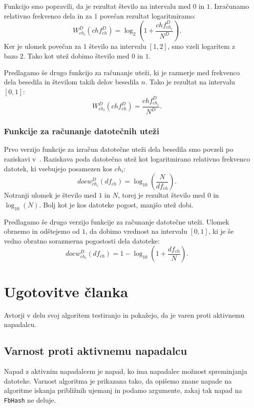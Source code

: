 \documentclass{acm_proc_article-sp}
\begin{document}
Funkcijo smo popravili, da je rezultat število na intervalu med $0$ in $1$. Izračunamo relativno frekvenco dela in za $1$ povečan rezultat logaritmiramo:
\[ W_{ch_i}^{D}(ch f_{ch}^D) = \log_2\left(1 + \frac{ch f_{ch_i}^D}{N^D}\right). \]
Ker je ulomek povečan za $1$ število na intervalu $[1, 2]$, smo vzeli logaritem z bazo $2$. Tako kot utež dobimo število med $0$ in $1$. 

Predlagamo še drugo funkcijo za računanje uteži, ki je razmerje med frekvenco dela besedila in številom takih delov besedila $n$. Tako je rezultat na intervalu $[0,1]$:
\[ W_{ch_i}^{D}(ch f_{ch}^D) = \frac{ch f_{ch_i}^D}{N^D}. \]

\subsubsection{Funkcije za računanje datotečnih uteži}
Prvo verzijo funkcije za izračun datotečne uteži dela besedila smo povzeli po raziskavi v~\cite{fbhash}. Raziskava poda datotečno utež kot logaritmirano relativno frekvenco datotek, ki vsebujejo posamezen kos $ch_i$:
\[ docw_{ch_i}^{D}(df_{ch}) = \log_{10}\left(\frac{N}{df_{ch}}\right). \]
Notranji ulomek je število med $1$ in $N$, torej je rezultat število med $0$ in $\log_{10}(N)$. Bolj kot je kos datoteke pogost, manjšo utež dobi.

Predlagamo še drugo verzijo funkcije za računanje datotečne uteži. Ulomek obrnemo in odštejemo od $1$, da dobimo vrednost na intervalu $[0, 1]$, ki je še vedno obratno sorazmerna pogostosti dela datoteke:
\[ docw_{ch_i}^{D}(df_{ch}) = 1 - \log_{10}\left(1+\frac{df_{ch}}{N}\right).\]

\section{Ugotovitve \v{c}lanka}

Avtorji v delu svoj algoritem testiranjo in pokažejo, da je varen proti aktivnemu napadalcu.

\subsection{Varnost proti aktivnemu napadalcu}

Napad z aktivnim napadalcem je napad, ko ima napadalec možnost spreminjanja datoteke. Varnost algoritma je prikazana tako, da opišemo znane napade na algoritme iskanja približnih ujemanj in podamo argumente, zakaj tak napad na \texttt{FbHash} ne deluje.
\end{document}

